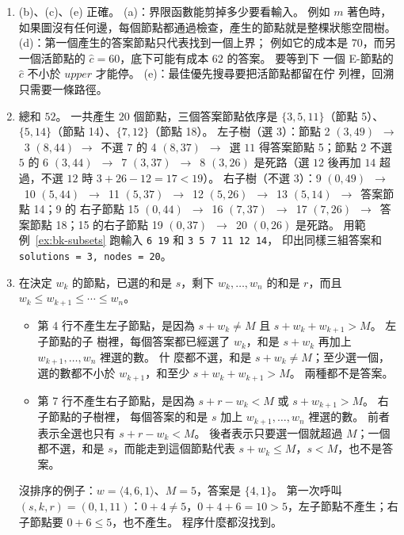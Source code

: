 \begin{enumerate}
\item (b)、(c)、(e) 正確。 (a)：界限函數能剪掉多少要看輸入。 例如 $m$ 著色時，如果圖沒有任何邊，每個節點都通過檢查，產生的節點就是整棵狀態空間樹。 (d)：第一個產生的答案節點只代表找到一個上界；
例如它的成本是 $70$，而另一個活節點的 $\hat c = 60$，底下可能有成本 $62$ 的答案。 要等到下
一個 E-節點的 $\hat c$ 不小於 $\mathit{upper}$ 才能停。 (e)：最佳優先搜尋要把活節點都留在佇
列裡，回溯只需要一條路徑。

\item 總和 $52$。 一共產生 $20$ 個節點，三個答案節點依序是 $\{3, 5, 11\}$（節點 5）、
$\{5, 14\}$（節點 14）、$\{7, 12\}$（節點 18）。 左子樹（選 $3$）：節點 2 $(3, 49)$~$\to$~3 $(8, 44)$
$\to$~不選 $7$ 的 4 $(8, 37)$~$\to$~選 $11$ 得答案節點 5；節點 2 不選 $5$ 的 6 $(3, 44)$~$\to$~7 $(3, 37)$~$\to$~8
$(3, 26)$ 是死路（選 $12$ 後再加 $14$ 超過，不選 $12$ 時 $3 + 26 - 12 = 17 < 19$）。 右子樹（不選
$3$）：9 $(0, 49)$~$\to$~10 $(5, 44)$~$\to$~11 $(5, 37)$~$\to$~12 $(5, 26)$~$\to$~13 $(5, 14)$~$\to$~答案節點 14；9 的
右子節點 15 $(0, 44)$~$\to$~16 $(7, 37)$~$\to$~17 $(7, 26)$~$\to$~答案節點 18；15 的右子節點 19 $(0, 37)$~$\to$~20
$(0, 26)$ 是死路。 用範例~\ref{ex:bk-subsets} 跑輸入 \texttt{6 19} 和 \texttt{3 5 7 11 12 14}，
印出同樣三組答案和 \texttt{solutions = 3, nodes = 20}。

\item 在決定 $w_k$ 的節點，已選的和是 $s$，剩下 $w_k, \ldots, w_n$ 的和是 $r$，而且
$w_k \le w_{k+1} \le \cdots \le w_n$。
\begin{itemize}
\item 第 4 行不產生左子節點，是因為 $s + w_k \ne M$ 且 $s + w_k + w_{k+1} > M$。 左子節點的子
樹裡，每個答案都已經選了 $w_k$，和是 $s + w_k$ 再加上 $w_{k+1}, \ldots, w_n$ 裡選的數。 什
麼都不選，和是 $s + w_k \ne M$；至少選一個，選的數都不小於 $w_{k+1}$，和至少
$s + w_k + w_{k+1} > M$。 兩種都不是答案。
\item 第 7 行不產生右子節點，是因為 $s + r - w_k < M$ 或 $s + w_{k+1} > M$。 右子節點的子樹裡，
每個答案的和是 $s$ 加上 $w_{k+1}, \ldots, w_n$ 裡選的數。 前者表示全選也只有 $s + r - w_k <
M$。 後者表示只要選一個就超過 $M$；一個都不選，和是 $s$，而能走到這個節點代表
$s + w_k \le M$，$s < M$，也不是答案。
\end{itemize}
沒排序的例子：$w = \langle 4, 6, 1 \rangle$、$M = 5$，答案是 $\{4, 1\}$。 第一次呼叫
$(s, k, r) = (0, 1, 11)$：$0 + 4 \ne 5$，$0 + 4 + 6 = 10 > 5$，左子節點不產生；右子節點要
$0 + 6 \le 5$，也不產生。 程序什麼都沒找到。


\end{enumerate}
